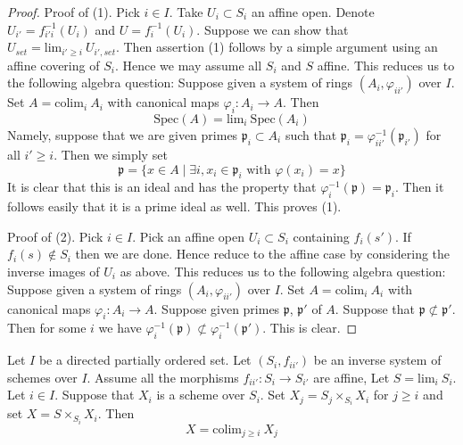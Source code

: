 \begin{proof}
Proof of (1). Pick $i \in I$.
Take $U_i \subset S_i$ an affine open.
Denote $U_{i'} = f_{i'i}^{-1}(U_i)$ and $U = f_i^{-1}(U_i)$.
Suppose we can show that
$U_{set} = \text{lim}_{i' \geq i}\ U_{i', set}$. Then assertion
(1) follows by a simple argument using an affine covering of $S_i$.
Hence we may assume all $S_i$ and $S$ affine.
This reduces us to the following algebra question:
Suppose given a system of rings $(A_i, \varphi_{ii'})$ over $I$. Set
$A = \text{colim}_i\ A_i$ with canonical maps $\varphi_i : A_i \to A$.
Then
$$
\text{Spec}(A) = \text{lim}_i\ \text{Spec}(A_i)
$$
Namely, suppose that we are given primes $\mathfrak p_i \subset A_i$
such that $\mathfrak p_i = \varphi_{ii'}^{-1}(\mathfrak p_{i'})$
for all $i' \geq i$. Then we simply set
$$
\mathfrak p =
\{x \in A
\mid
\exists i, x_i \in \mathfrak p_i \text{ with }\varphi(x_i) = x\}
$$
It is clear that this is an ideal and has the property that
$\varphi_i^{-1}(\mathfrak p) = \mathfrak p_i$. Then it follows
easily that it is a prime ideal as well. This proves (1).

\medskip\noindent
Proof of (2). Pick $i \in I$. Pick an affine open $U_i \subset S_i$
containing $f_i(s')$. If $f_i(s) \not \in S_i$ then we
are done. Hence reduce to the affine case by considering the inverse
images of $U_i$ as above. 
This reduces us to the following algebra question:
Suppose given a system of rings $(A_i, \varphi_{ii'})$ over $I$. Set
$A = \text{colim}_i\ A_i$ with canonical maps $\varphi_i : A_i \to A$.
Suppose given primes $\mathfrak p$, $\mathfrak p'$ of $A$.
Suppose that $\mathfrak p \not \subset \mathfrak p'$.
Then for some $i$ we have
$\varphi_i^{-1}(\mathfrak p) \not \subset \varphi_i^{-1}(\mathfrak p')$.
This is clear.
\end{proof}

\begin{lemma}
\label{lemma-scheme-over-limit}
Let $I$ be a directed partially ordered set.
Let $(S_i, f_{ii'})$ be an inverse system of schemes over $I$.
Assume all the morphisms $f_{ii'} : S_i \to S_{i'}$ are affine,
Let $S = \text{lim}_i\ S_i$. Let $i \in I$.
Suppose that $X_i$ is a scheme over $S_i$.
Set $X_j = S_j \times_{S_i} X_i$ for $j \geq i$ and set
$X = S \times_{S_i} X_i$.
Then
$$
X = \text{colim}_{j \geq i}\ X_j
$$
\end{lemma}

